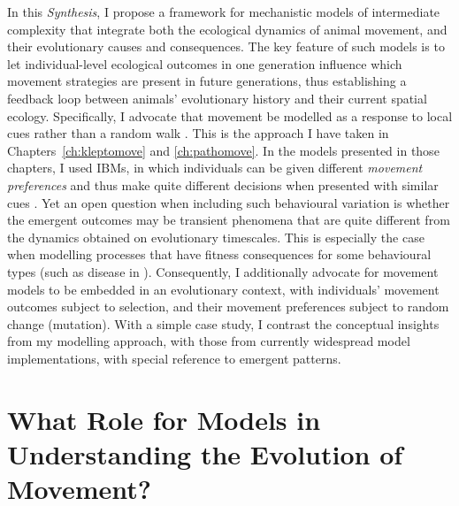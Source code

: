 In this \textit{Synthesis}, I propose a framework for mechanistic models of intermediate complexity that integrate both the ecological dynamics of animal movement, and their evolutionary causes and consequences.
The key feature of such models is to let individual-level ecological outcomes in one generation influence which movement strategies are present in future generations, thus establishing a feedback loop between animals' evolutionary history and their current spatial ecology.
Specifically, I advocate that movement be modelled as a response to local cues rather than a random walk \citep[`mechanistic'; see][]{mueller2011}.
This is the approach I have taken in Chapters~\ref{ch:kleptomove} and \ref{ch:pathomove}.
In the models presented in those chapters, I used IBMs, in which individuals can be given different \emph{movement preferences} and thus make quite different decisions when presented with similar cues \citep{getz2015,white2018}.
Yet an open question when including such behavioural variation is whether the emergent outcomes may be transient phenomena that are quite different from the dynamics obtained on evolutionary timescales.
This is especially the case when modelling processes that have fitness consequences for some behavioural types (such as disease in \cite[]{white2018}).
Consequently, I additionally advocate for movement models to be embedded in an evolutionary context, with individuals' movement outcomes subject to selection, and their movement preferences subject to random change (mutation).
With a simple case study, I contrast the conceptual insights from my modelling approach, with those from currently widespread model implementations, with special reference to emergent patterns.


\section*{What Role for Models in Understanding the Evolution of Movement?}

